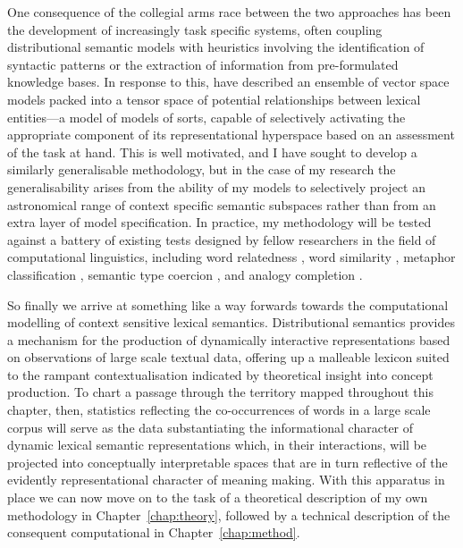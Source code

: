 One consequence of the collegial arms race between the two approaches has been the development of increasingly task specific systems, often coupling distributional semantic models with heuristics involving the identification of syntactic patterns or the extraction of information from pre-formulated knowledge bases.  In response to this, \cite{BaroniEA2010b} have described an ensemble of vector space models packed into a tensor space of potential relationships between lexical entities---a model of models of sorts, capable of selectively activating the appropriate component of its representational hyperspace based on an assessment of the task at hand.  This is well motivated, and I have sought to develop a similarly generalisable methodology, but in the case of my research the generalisability arises from the ability of my models to selectively project an astronomical range of context specific semantic subspaces rather than from an extra layer of model specification.  In practice, my methodology will be tested against a battery of existing tests designed by fellow researchers in the field of computational linguistics, including word relatedness \citep{FinkelsteinEA2002}, word similarity \citep{HillEA2015}, metaphor classification \citep{GutierrezEA2016}, semantic type coercion \citep{PustejovskyEA2010}, and analogy completion \citep{MikolovEA2013}.

So finally we arrive at something like a way forwards towards the computational modelling of context sensitive lexical semantics.  Distributional semantics provides a mechanism for the production of dynamically interactive representations based on observations of large scale textual data, offering up a malleable lexicon suited to the rampant contextualisation indicated by theoretical insight into concept production.  To chart a passage through the territory mapped throughout this chapter, then, statistics reflecting the co-occurrences of words in a large scale corpus will serve as the data substantiating the informational character of dynamic lexical semantic representations which, in their interactions, will be projected into conceptually interpretable spaces that are in turn reflective of the evidently representational character of meaning making.  With this apparatus in place we can now move on to the task of a theoretical description of my own methodology in Chapter~\ref{chap:theory}, followed by a technical description of the consequent computational in Chapter~\ref{chap:method}.

